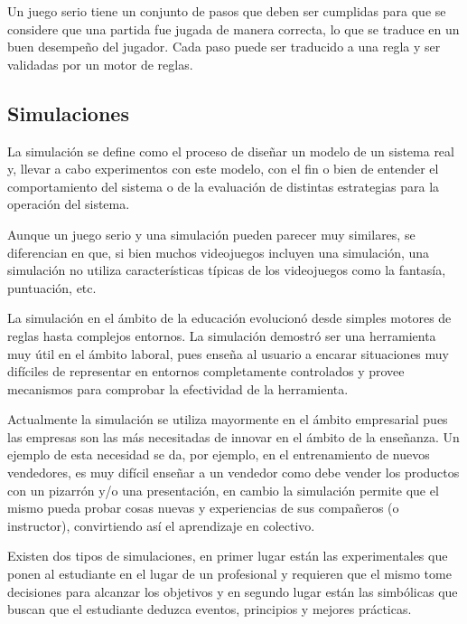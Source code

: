 

Un juego serio tiene un conjunto de pasos que deben ser cumplidas para 
que se considere que una partida fue jugada de manera correcta, lo que se traduce 
en un buen desempeño del jugador. Cada paso puede ser traducido a una regla
y ser validadas por un motor de reglas. 

\subsection{Simulaciones}

La simulación se define como el proceso de diseñar un modelo de un sistema real
y, llevar a cabo experimentos con este modelo, con el fin o bien de entender el
comportamiento del sistema o de la evaluación de distintas estrategias para la
operación del sistema\cite{ingalls2008introduction}. 

Aunque un juego serio y una simulación pueden parecer muy similares, se
diferencian en que, si bien muchos videojuegos incluyen una simulación, una
simulación no utiliza características típicas de los videojuegos como la
fantasía, puntuación, etc\cite{sg:aoverview}.

La simulación en el ámbito de la educación evolucionó desde simples motores de
reglas hasta complejos entornos. La simulación demostró ser una herramienta muy
útil en el ámbito laboral\cite{guenaga2013serious}, pues enseña al usuario a
encarar situaciones muy difíciles de representar en entornos completamente
controlados y provee mecanismos para comprobar la efectividad de la herramienta. 

Actualmente la simulación se utiliza mayormente en el ámbito empresarial pues las
empresas son las más necesitadas de innovar en el ámbito de la enseñanza. Un
ejemplo de esta necesidad se da, por ejemplo, en el entrenamiento de nuevos
vendedores, es muy difícil enseñar a un vendedor como debe vender los productos
con un pizarrón y/o una presentación, en cambio la simulación permite que el
mismo pueda probar cosas nuevas y experiencias de sus compañeros (o instructor),
convirtiendo así el aprendizaje en colectivo\cite{guenaga2013serious}.

Existen dos tipos de simulaciones, en primer lugar están las experimentales que
ponen al estudiante en el lugar de un profesional y requieren que el mismo tome
decisiones para alcanzar los objetivos y en segundo lugar están las simbólicas
que buscan que el estudiante deduzca eventos, principios y mejores
prácticas\cite{charsky:2010}. 

